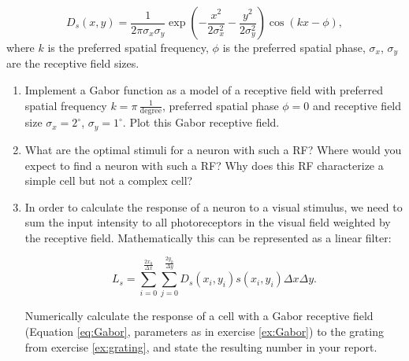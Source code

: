 \documentclass[12pt, a4]{article}
\begin{document}
\begin{enumerate}
        \begin{equation}
           D_s(x,y)=\frac{1}{2\pi\sigma_x\sigma_y}
            \exp\left(-\frac{x^2}{2\sigma_x^2}-\frac
            {y^2}{ 2\sigma_y^2}\right)\cos(kx-\phi),
            \label{eq:Gabor}
        \end{equation}
        where  $k$ is the preferred spatial frequency, $\phi$ is
        the preferred spatial phase,  $\sigma_x$,
        $\sigma_y$ are the receptive field sizes.

        \begin{enumerate}
            \item \label{ex:Gabor}  Implement a Gabor function as a model of
                a receptive field with preferred spatial frequency
                $k=\pi\,\frac{1}{\mathrm{degree}}$,
                preferred spatial phase $\phi=0$
                and receptive field size $\sigma_x=2^\circ$,
                $\sigma_y=1^\circ$. Plot this Gabor receptive field.
                
            \item \label{ex:RF_questions} What are the optimal
                stimuli for a neuron with such a RF? Where would you
                expect to find a neuron with such a RF?  Why does this
                RF characterize a simple cell but not a complex cell?
                
            \item \label{ex:linear_response} In order to calculate the
                response of a neuron to a visual stimulus, we need to
                sum the input intensity to all photoreceptors in the
                visual field weighted by the receptive field.
                Mathematically this can be represented as a linear
                filter:

                \begin{equation}
                    L_s = \sum_{i=0}^{\frac{2x_0}{\Delta x}}
                    \sum_{j=0}^{\frac{2y_0}{\Delta y}} D_s(x_i,y_i) s(x_i,y_i)
                    \Delta x \Delta y.
                    \label{eq:respons}
                \end{equation}
                
                Numerically calculate the response of a cell with a Gabor
                receptive field (Equation \ref{eq:Gabor}, parameters
                as in exercise \ref{ex:Gabor}) to the grating from exercise
                \ref{ex:grating}, and state the resulting number in
                your report.
        \end{enumerate}


\end{enumerate}
\end{document}
